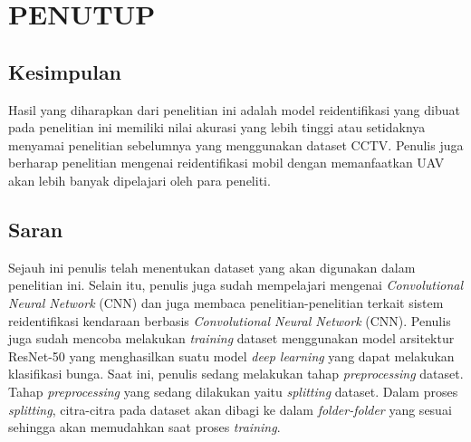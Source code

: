 \chapter{PENUTUP}

\section{Kesimpulan}

Hasil yang diharapkan dari penelitian ini adalah model reidentifikasi yang dibuat pada penelitian ini memiliki nilai akurasi yang lebih tinggi atau setidaknya menyamai penelitian sebelumnya yang menggunakan dataset CCTV. Penulis juga berharap penelitian mengenai reidentifikasi mobil dengan memanfaatkan UAV akan lebih banyak dipelajari oleh para peneliti.

\section{Saran}

Sejauh ini penulis telah menentukan dataset yang akan digunakan dalam penelitian ini. Selain itu, penulis juga sudah mempelajari mengenai \emph{Convolutional Neural Network} (CNN) dan juga membaca penelitian-penelitian terkait sistem reidentifikasi kendaraan berbasis \emph{Convolutional Neural Network} (CNN). Penulis juga sudah mencoba melakukan \emph{training} dataset menggunakan model arsitektur ResNet-50 yang menghasilkan suatu model \emph{deep learning} yang dapat melakukan klasifikasi bunga. Saat ini, penulis sedang melakukan tahap \emph{preprocessing} dataset. Tahap \emph{preprocessing} yang sedang dilakukan yaitu \emph{splitting} dataset. Dalam proses \emph{splitting}, citra-citra pada dataset akan dibagi ke dalam \emph{folder-folder} yang sesuai sehingga akan memudahkan saat proses \emph{training}.
